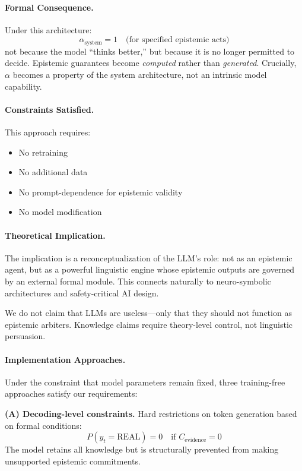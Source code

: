 \documentclass[11pt,a4paper]{article}
\begin{document}
\paragraph{Formal Consequence.}
Under this architecture:
\[
\alpha_{\text{system}} = 1 \quad \text{(for specified epistemic acts)}
\]
not because the model ``thinks better,'' but because it is no longer permitted to decide. Epistemic guarantees become \emph{computed} rather than \emph{generated}. Crucially, $\alpha$ becomes a property of the system architecture, not an intrinsic model capability.

\paragraph{Constraints Satisfied.}
This approach requires:
\begin{itemize}
    \item No retraining
    \item No additional data
    \item No prompt-dependence for epistemic validity
    \item No model modification
\end{itemize}

\paragraph{Theoretical Implication.}
The implication is a reconceptualization of the LLM's role: not as an epistemic agent, but as a powerful linguistic engine whose epistemic outputs are governed by an external formal module. This connects naturally to neuro-symbolic architectures and safety-critical AI design.

We do not claim that LLMs are useless---only that they should not function as epistemic arbiters. Knowledge claims require theory-level control, not linguistic persuasion.

\paragraph{Implementation Approaches.}
Under the constraint that model parameters remain fixed, three training-free approaches satisfy our requirements:

\textbf{(A) Decoding-level constraints.} Hard restrictions on token generation based on formal conditions:
\[
P(y_t = \text{REAL}) = 0 \quad \text{if } C_{\text{evidence}} = 0
\]
The model retains all knowledge but is structurally prevented from making unsupported epistemic commitments.
\end{document}
